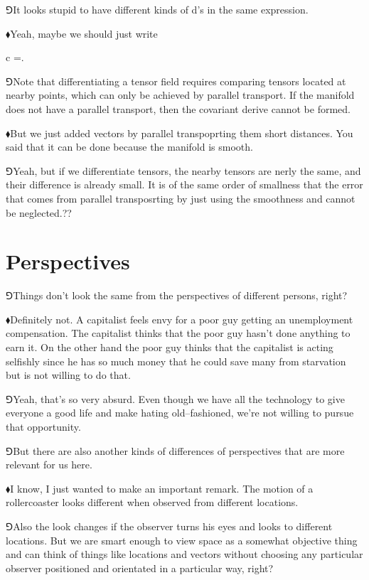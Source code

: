 \documentclass[11pt,oneside%
]{memoir}
\newenvironment{eqna}{\begin{IEEEeqnarray*}{c}}{\end{IEEEeqnarray*}\ignorespacesafterend}
\newcommand{\hea}{\(\blacklozenge\)\;}
\newcommand{\heb}{\(\Game\)\;}
\begin{document}
\heb It looks stupid to have different kinds of d's in the same expression.

\hea Yeah, maybe we should just write
\begin{eqna}
    =.
\end{eqna}

\heb Note that differentiating a tensor field requires comparing tensors located at nearby points, which can only be achieved by parallel transport. If the manifold does not have a parallel transport, then the covariant derive cannot be formed.

\hea But we just added vectors by parallel transpoprting them short distances. You said that it can be done because the manifold is smooth.

\heb Yeah, but if we differentiate tensors, the nearby tensors are nerly the same, and their difference is already small. It is of the same order of smallness that the error that comes from parallel transposrting by just using the smoothness and cannot be neglected.??
\section{Perspectives}
\heb Things don't look the same from the perspectives of different persons, right?

\hea Definitely not. A capitalist feels envy for a poor guy getting an unemployment compensation. The capitalist thinks that the poor guy hasn't done anything to earn it. On the other hand the poor guy thinks that the capitalist is acting selfishly since he has so much money that he could save many from starvation but is not willing to do that.

\heb Yeah, that's so very absurd. Even though we have all the technology to give everyone a good life and make hating old--fashioned, we're not willing to pursue that opportunity.

\heb But there are also another kinds of differences of perspectives that are more relevant for us here.

\hea I know, I just wanted to make an important remark. The motion of a rollercoaster looks different when observed from different locations.

\heb Also the look changes if the observer turns his eyes and looks to different locations. But we are smart enough to view space as a somewhat objective thing and can think of things like locations and vectors without choosing any particular observer positioned and orientated in a particular way, right?
\end{document}
